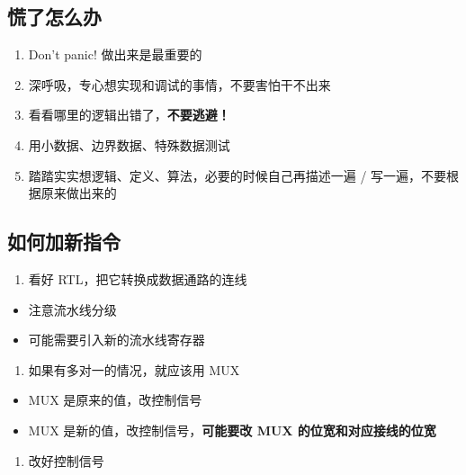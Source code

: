 \documentclass[12pt,AutoFakeBold,AutoFakeSlant]{article}
\providecommand{\tightlist}{%
  \setlength{\itemsep}{0pt}\setlength{\parskip}{0pt}}
\begin{document}
\hypertarget{ux614cux4e86ux600eux4e48ux529e}{%
\subsection{慌了怎么办}\label{ux614cux4e86ux600eux4e48ux529e}}

\begin{enumerate}
\def\labelenumi{\arabic{enumi}.}
\tightlist
\item
  Don't panic! 做出来是最重要的
\item
  深呼吸，专心想实现和调试的事情，不要害怕干不出来
\item
  看看哪里的逻辑出错了，\textbf{不要逃避！}
\item
  用小数据、边界数据、特殊数据测试
\item
  踏踏实实想逻辑、定义、算法，必要的时候自己再描述一遍 /
  写一遍，不要根据原来做出来的
\end{enumerate}

\hypertarget{ux5982ux4f55ux52a0ux65b0ux6307ux4ee4}{%
\subsection{如何加新指令}\label{ux5982ux4f55ux52a0ux65b0ux6307ux4ee4}}

\begin{enumerate}
\def\labelenumi{\arabic{enumi}.}
\tightlist
\item
  看好 RTL，把它转换成数据通路的连线
\end{enumerate}

\begin{itemize}
\tightlist
\item
  注意流水线分级
\item
  可能需要引入新的流水线寄存器
\end{itemize}

\begin{enumerate}
\def\labelenumi{\arabic{enumi}.}
\setcounter{enumi}{1}
\tightlist
\item
  如果有多对一的情况，就应该用 MUX
\end{enumerate}

\begin{itemize}
\tightlist
\item
  MUX 是原来的值，改控制信号
\item
  MUX 是新的值，改控制信号，\textbf{可能要改 MUX 的位宽和对应接线的位宽}
\end{itemize}

\begin{enumerate}
\def\labelenumi{\arabic{enumi}.}
\setcounter{enumi}{2}
\tightlist
\item
  改好控制信号
\end{enumerate}
\end{document}
